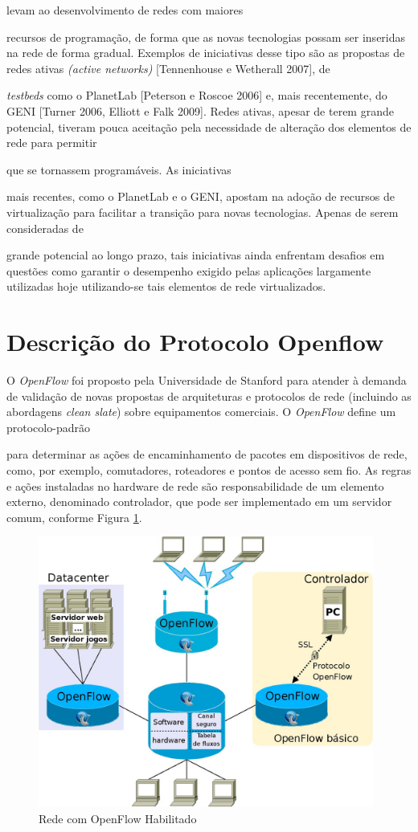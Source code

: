 levam ao desenvolvimento de redes com maiores 

recursos de programação, de forma que as 
novas 
tecnologias possam ser inseridas na rede de 
forma gradual.
Exemplos de iniciativas desse tipo são as 
propostas de redes ativas \textit{(active 
networks)} [Tennenhouse e Wetherall 2007], de 

\textit{testbeds} como o PlanetLab [Peterson 
e 
Roscoe 2006] e, mais recentemente, do GENI 
[Turner 2006, Elliott e Falk 2009]. Redes 
ativas, apesar de terem grande potencial, 
tiveram pouca aceitação pela necessidade de 
alteração dos elementos de rede para permitir 

que se tornassem programáveis. As iniciativas 

mais recentes, como o PlanetLab e o GENI, 
apostam na adoção de recursos de 
virtualização 
para facilitar a transição para novas 
tecnologias. Apenas de serem consideradas de 

grande potencial ao longo prazo, tais 
iniciativas ainda enfrentam desafios em 
questões como garantir o desempenho exigido 
pelas aplicações largamente utilizadas hoje 
utilizando-se tais elementos de rede 
virtualizados.

\section{Descrição do Protocolo Openflow}

O \textit{OpenFlow} foi proposto pela 
Universidade de Stanford para atender à 
demanda de validação
de novas propostas de arquiteturas e 
protocolos de rede (incluindo as abordagens 
\textit{clean slate})
sobre equipamentos comerciais. O 
\textit{OpenFlow} define um protocolo-padrão 

para determinar as
ações de encaminhamento de pacotes em 
dispositivos de rede, como, por exemplo,
comutadores, roteadores e pontos de acesso sem 
fio. As regras e ações instaladas no
hardware de rede são responsabilidade de um 
elemento externo, denominado controlador, 
que
pode ser implementado em um servidor comum, 
conforme Figura \ref{fig:openflow}. 

\begin{figure}[hb]
\centering
\includegraphics[width=110mm]{openflow.png}
\caption{Rede com OpenFlow Habilitado}
\label{fig:openflow}
\end{figure}

